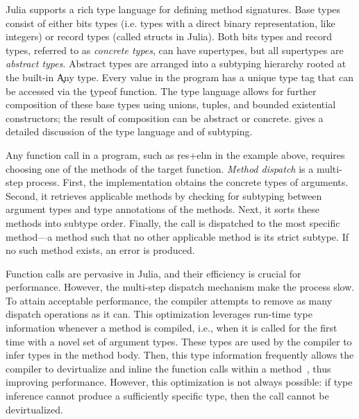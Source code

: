 \documentclass[sigplan,screen]{acmart}
\begin{document}


Julia supports a rich type language for defining method signatures. Base types
consist of either bits types (i.e. types with a direct binary representation,
like integers) or record types (called structs in Julia). Both bits types and
record types, referred to as \emph{concrete types}, can have supertypes, but all
supertypes are \emph{abstract types}. Abstract types are arranged into a
subtyping hierarchy rooted at the built-in \c{Any} type. Every value in the
program has a unique type tag that can be accessed via the \c{typeof} function.
%
The type language allows for further composition of these base
types using unions, tuples, and bounded existential constructors; the result of
composition can be abstract or concrete. \citet{oopsla18b} gives a detailed
discussion of the type language and of subtyping.

Any function call in a program, such as \c{res+elm} in the example above,
requires choosing one of the methods of the target function. \emph{Method
dispatch} is a multi-step process. First, the implementation obtains the
concrete types of arguments. Second, it retrieves applicable methods by checking
for subtyping between argument types and type annotations of the methods. Next,
it sorts these methods into subtype order. Finally, the call is dispatched to
the most specific method---a method such that no other applicable method is its
strict subtype. If no such method exists, an error is produced.

Function calls are pervasive in Julia, and their efficiency is crucial for
performance. However, the multi-step dispatch mechanism
make the process slow. To attain acceptable performance, the compiler attempts
to remove as many dispatch operations as it can. This optimization leverages
run-time type information whenever a method is compiled, i.e., when it is called
for the first time with a novel set of argument types.  These types are used by
the compiler to infer types in the method body. Then, this type information
frequently allows the compiler to devirtualize and inline the function calls
within a method~\cite{aigner}, thus improving performance. However, this
optimization is not always possible: if type inference cannot produce a
sufficiently specific type, then the call cannot be devirtualized.
\end{document}
